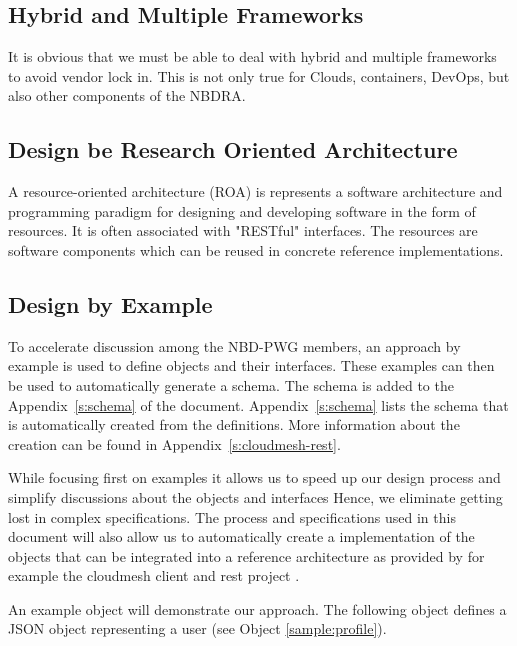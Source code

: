 \documentclass[10pt]{article}
\begin{document}
\subsection{Hybrid and Multiple Frameworks}

It is obvious that we must be able to deal with hybrid and multiple
frameworks to avoid vendor lock in. This is not only true for Clouds,
containers, DevOps, but also other components of the NBDRA. 

\subsection{Design be Research Oriented Architecture}

A resource-oriented architecture (ROA) is represents a software
architecture and programming paradigm for designing and developing
software in the form of resources. It is often associated with
"RESTful" interfaces. The resources are software components which can
be reused in concrete reference implementations. 

\subsection{Design by Example}

To accelerate discussion among the NBD-PWG members, an approach by example is
used to define objects and their interfaces. These examples can then be used 
to automatically generate a schema. The schema is added to the 
Appendix~\ref{s:schema} of the document. Appendix~\ref{s:schema} lists 
the schema that is automatically created from the definitions. More information 
about the creation can be found in Appendix~\ref{s:cloudmesh-rest}.

While focusing first on examples it allows us to speed up our design
process and simplify discussions about the objects and interfaces
Hence, we eliminate getting lost in complex specifications. The
process and specifications used in this document will also allow us to
automatically create a implementation of the objects that can be
integrated into a reference architecture as provided by for example
the cloudmesh client and rest project \cite{www-cloudmesh-client}\cite{cloudmesh-nist}.

An example object will demonstrate our approach. The following object
defines a JSON object representing a user (see Object \ref{sample:profile}). 

\end{document}
